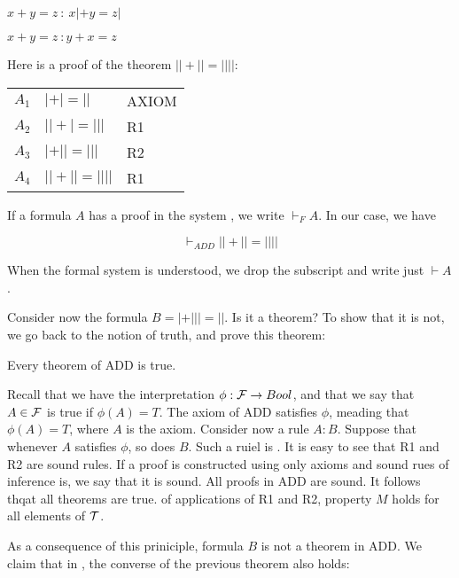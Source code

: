 \begin{indent}
 $x + y = z \ : \ x| + y = z|$
\end{indent}

\begin{indent}
 $x + y = z \ : y + x = z$
\end{indent}

Here is a proof of the theorem $|| + || = ||||$:

\begin{indent}
\begin{tabular}{lll}
$A_1$ & $| + | = ||$ & AXIOM \\
$A_2$ &$|| + | = |||$ & R1 \\
$A_3$ &$| + || = |||$ & R2 \\
$A_4$ &$|| + || = ||||$ & R1 \\
\end{tabular}
\end{indent}




If a formula $A$ has a proof in the system , we write $\vdash_F A$.  In our case, we have

$$
\vdash_{ADD} || + ||  = ||||
$$

When the formal system is understood, we drop the subscript and write just $\vdash A$.

Consider now the formula $B = | + ||| = ||$.  Is it a theorem? To show that it is not, we go back to the notion of truth, and prove this theorem:

\begin{theorem}
\label{add:soundness}
Every theorem of ADD is true.
\end{theorem}



 Recall that we have the interpretation $\phi: \mathcal{F} \to Bool$, and that we say that $A \in \mathcal{F}$ is true if $\phi(A) = T$. The axiom of ADD satisfies $\phi$, meading that $\phi(A) = T$, where $A$ is the axiom.   Consider now a rule $A : B$. Suppose that whenever $A$ satisfies $\phi$, so does $B$.  Such a ruiel is .  It is easy to see that R1 and R2 are sound rules.  If a proof is constructed using only axioms and sound rues of inference is, we say that it is sound.
All proofs in ADD are sound. It follows thqat all theorems are true. of applications of R1 and R2, property $M$ holds for all elements of $\mathcal{T}$. 

As a consequence of this priniciple, formula $B$ is not a theorem in ADD.
We claim that in , the converse of the previous theorem also holds:

